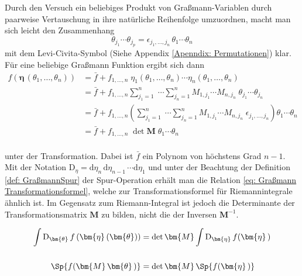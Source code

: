 \noindent Durch den Versuch ein beliebiges Produkt von Graßmann-Variablen durch paarweise Vertauschung in ihre natürliche Reihenfolge umzuordnen, macht man sich leicht den Zusammenhang   
\begin{equation} \label{eq: sort_graßmann}
\theta_{j_1} \cdots \theta_{j_p} = \epsilon_{j_1,\dots,j_n} \, \theta_{1} \cdots \theta_{n}
\end{equation}
 mit dem Levi-Civita-Symbol (Siehe Appendix \ref{Apenndix: Permutationen}) klar. 
\noindent Für eine beliebige Graßmann Funktion ergibt sich dann 
\begin{align}
f(\bm{\eta}\,(\theta_1, \dots, \theta_n))
&= \bar{f} + f_{1,\dots,n}\;\eta_1(\theta_1, \dots, \theta_n)\cdots\eta_n(\theta_1, \dots, \theta_n) \nonumber \\
&= \bar{f} + f_{1,\dots,n} \sum_{{j_1}=1}^n\;\cdots \sum_{{j_n}=1}^n M_{{1},{j_1}}\cdots M_{{n},{j_n}}\;\theta_{j_1} \cdots \theta_{j_n} \nonumber \\
&= \bar{f} + f_{1,\dots,n} \left(\sum_{{j_1}=1}^n\;\cdots \sum_{{j_n}=1}^n M_{{1},{j_1}}\cdots M_{{n},{j_n}}\; \epsilon_{j_1,\dots,j_n}\right) \theta_{1} \cdots \theta_{n} \nonumber \\
&= \bar{f} + f_{1,\dots,n} \; \det{\bm{M}} \; \theta_{1} \cdots \theta_{n} \label{eq: transform last coeff} 
\end{align}\\
unter der Transformation. Dabei ist $\bar f$ ein Polynom von höchstens Grad $n-1$. Mit der Notation $\mathrm{D}_{\eta} = \mathrm{d}\eta_n\,\mathrm{d}\eta_{n-1}\,\cdots \mathrm{d}\eta_1 $ und unter der Beachtung der Definition \eqref{def: GraßmannSpur} der Spur-Operation erhält man die Relation \eqref{eq: Graßmann Transformationsformel}, welche zur Transformationsformel für Riemannintegrale ähnlich ist. Im Gegensatz zum Riemann-Integral ist jedoch die Determinante der Transformationsmatrix $\bm{M}$ zu bilden, nicht die der Inversen $\bm{M}^{-1}$. \\
\begin{grayframe}[frametitle = {Für Variablentransformationen $\bm{\eta}\left(\bm{\theta}\right) = M\,\bm{\theta}$ gilt:}]
\begin{align} \label{eq: Graßmann Transformationsformel}
    \int \mathrm{D}_{\bm{\theta}}\, f\left(\bm{\eta}\left(\bm{\theta}\right)\right)  &= \det{\bm{M}} \int \mathrm{D}_{\bm{\eta}}\, f(\bm{\eta}\,) \\
    \nonumber \\
    \Sp{f( \bm{M}\,\bm{\theta}\,)} &=  \det{\bm{M}} \,\Sp{f(\bm{\eta}\,)}
\end{align}
\end{grayframe}

